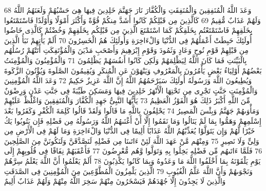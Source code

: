 \documentclass[20pt,a4paper]{article}
\begin{document}
{\tiny\colorbox{cl_aya}{68}} وَعَدَ اللَّهُ الْمُنَفِقِينَ وَالْمُنَفِقَتِ وَالْكُفَّارَ نَارَ جَهَنَّمَ خَلِدِينَ فِيهَا هِىَ حَسْبُهُمْ وَلَعَنَهُمُ اللَّهُ وَلَهُمْ عَذَابٌ مُّقِيمٌ
{\tiny\colorbox{cl_aya}{69}} كَالَّذِينَ مِن قَبْلِكُمْ كَانُوا أَشَدَّ مِنكُمْ قُوَّةً وَأَكْثَرَ أَمْوَلًا وَأَوْلَدًا فَاسْتَمْتَعُوا بِخَلَقِهِمْ فَاسْتَمْتَعْتُم بِخَلَقِكُمْ كَمَا اسْتَمْتَعَ الَّذِينَ مِن قَبْلِكُم بِخَلَقِهِمْ وَخُضْتُمْ كَالَّذِى خَاضُوا أُولَئِكَ حَبِطَتْ أَعْمَلُهُمْ فِى الدُّنْيَا وَالْءَاخِرَةِ وَأُولَئِكَ هُمُ الْخَسِرُونَ
{\tiny\colorbox{cl_aya}{70}} أَلَمْ يَأْتِهِمْ نَبَأُ الَّذِينَ مِن قَبْلِهِمْ قَوْمِ نُوحٍ وَعَادٍ وَثَمُودَ وَقَوْمِ إِبْرَهِيمَ وَأَصْحَبِ مَدْيَنَ وَالْمُؤْتَفِكَتِ أَتَتْهُمْ رُسُلُهُم بِالْبَيِّنَتِ فَمَا كَانَ اللَّهُ لِيَظْلِمَهُمْ وَلَكِن كَانُوا أَنفُسَهُمْ يَظْلِمُونَ
{\tiny\colorbox{cl_aya}{71}} وَالْمُؤْمِنُونَ وَالْمُؤْمِنَتُ بَعْضُهُمْ أَوْلِيَاءُ بَعْضٍ يَأْمُرُونَ بِالْمَعْرُوفِ وَيَنْهَوْنَ عَنِ الْمُنكَرِ وَيُقِيمُونَ الصَّلَوةَ وَيُؤْتُونَ الزَّكَوةَ وَيُطِيعُونَ اللَّهَ وَرَسُولَهُ أُولَئِكَ سَيَرْحَمُهُمُ اللَّهُ إِنَّ اللَّهَ عَزِيزٌ حَكِيمٌ
{\tiny\colorbox{cl_aya}{72}} وَعَدَ اللَّهُ الْمُؤْمِنِينَ وَالْمُؤْمِنَتِ جَنَّتٍ تَجْرِى مِن تَحْتِهَا الْأَنْهَرُ خَلِدِينَ فِيهَا وَمَسَكِنَ طَيِّبَةً فِى جَنَّتِ عَدْنٍ وَرِضْوَنٌ مِّنَ اللَّهِ أَكْبَرُ ذَلِكَ هُوَ الْفَوْزُ الْعَظِيمُ
{\tiny\colorbox{cl_aya}{73}} يَأَيُّهَا النَّبِىُّ جَهِدِ الْكُفَّارَ وَالْمُنَفِقِينَ وَاغْلُظْ عَلَيْهِمْ وَمَأْوَىهُمْ جَهَنَّمُ وَبِئْسَ الْمَصِيرُ
{\tiny\colorbox{cl_aya}{74}} يَحْلِفُونَ بِاللَّهِ مَا قَالُوا وَلَقَدْ قَالُوا كَلِمَةَ الْكُفْرِ وَكَفَرُوا بَعْدَ إِسْلَمِهِمْ وَهَمُّوا بِمَا لَمْ يَنَالُوا وَمَا نَقَمُوا إِلَّا أَنْ أَغْنَىهُمُ اللَّهُ وَرَسُولُهُ مِن فَضْلِهِ فَإِن يَتُوبُوا يَكُ خَيْرًا لَّهُمْ وَإِن يَتَوَلَّوْا يُعَذِّبْهُمُ اللَّهُ عَذَابًا أَلِيمًا فِى الدُّنْيَا وَالْءَاخِرَةِ وَمَا لَهُمْ فِى الْأَرْضِ مِن وَلِىٍّ وَلَا نَصِيرٍ
{\tiny\colorbox{cl_aya}{75}} وَمِنْهُم مَّنْ عَهَدَ اللَّهَ لَئِنْ ءَاتَىنَا مِن فَضْلِهِ لَنَصَّدَّقَنَّ وَلَنَكُونَنَّ مِنَ الصَّلِحِينَ
{\tiny\colorbox{cl_aya}{76}} فَلَمَّا ءَاتَىهُم مِّن فَضْلِهِ بَخِلُوا بِهِ وَتَوَلَّوا وَّهُم مُّعْرِضُونَ
{\tiny\colorbox{cl_aya}{77}} فَأَعْقَبَهُمْ نِفَاقًا فِى قُلُوبِهِمْ إِلَى يَوْمِ يَلْقَوْنَهُ بِمَا أَخْلَفُوا اللَّهَ مَا وَعَدُوهُ وَبِمَا كَانُوا يَكْذِبُونَ
{\tiny\colorbox{cl_aya}{78}} أَلَمْ يَعْلَمُوا أَنَّ اللَّهَ يَعْلَمُ سِرَّهُمْ وَنَجْوَىهُمْ وَأَنَّ اللَّهَ عَلَّمُ الْغُيُوبِ
{\tiny\colorbox{cl_aya}{79}} الَّذِينَ يَلْمِزُونَ الْمُطَّوِّعِينَ مِنَ الْمُؤْمِنِينَ فِى الصَّدَقَتِ وَالَّذِينَ لَا يَجِدُونَ إِلَّا جُهْدَهُمْ فَيَسْخَرُونَ مِنْهُمْ سَخِرَ اللَّهُ مِنْهُمْ وَلَهُمْ عَذَابٌ أَلِيمٌ
\end{document}
